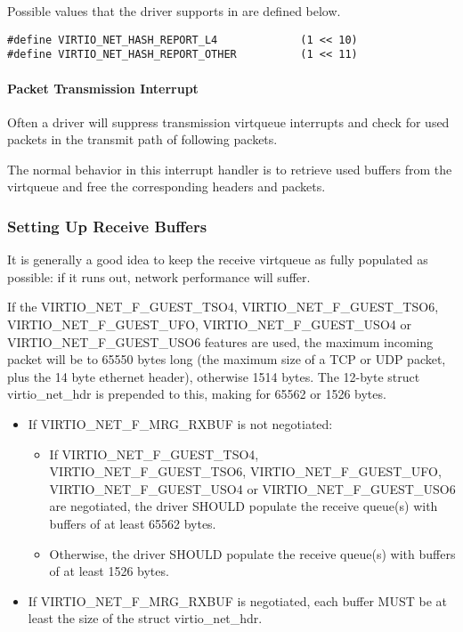 Possible values that the driver supports in  are defined below.

\begin{lstlisting}
#define VIRTIO_NET_HASH_REPORT_L4             (1 << 10)
#define VIRTIO_NET_HASH_REPORT_OTHER          (1 << 11)
\end{lstlisting}

\paragraph{Packet Transmission Interrupt}\label{sec:Device Types / Network Device / Device Operation / Packet Transmission / Packet Transmission Interrupt}

Often a driver will suppress transmission virtqueue interrupts
and check for used packets in the transmit path of following
packets.

The normal behavior in this interrupt handler is to retrieve
used buffers from the virtqueue and free the corresponding
headers and packets.

\subsubsection{Setting Up Receive Buffers}\label{sec:Device Types / Network Device / Device Operation / Setting Up Receive Buffers}

It is generally a good idea to keep the receive virtqueue as
fully populated as possible: if it runs out, network performance
will suffer.

If the VIRTIO_NET_F_GUEST_TSO4, VIRTIO_NET_F_GUEST_TSO6,
VIRTIO_NET_F_GUEST_UFO, VIRTIO_NET_F_GUEST_USO4 or VIRTIO_NET_F_GUEST_USO6
features are used, the maximum incoming packet
will be to 65550 bytes long (the maximum size of a
TCP or UDP packet, plus the 14 byte ethernet header), otherwise
1514 bytes.  The 12-byte struct virtio_net_hdr is prepended to this,
making for 65562 or 1526 bytes.


\begin{itemize}
\item If VIRTIO_NET_F_MRG_RXBUF is not negotiated:
  \begin{itemize}
    \item If VIRTIO_NET_F_GUEST_TSO4, VIRTIO_NET_F_GUEST_TSO6, VIRTIO_NET_F_GUEST_UFO,
	VIRTIO_NET_F_GUEST_USO4 or VIRTIO_NET_F_GUEST_USO6 are negotiated, the driver SHOULD populate
      the receive queue(s) with buffers of at least 65562 bytes.
    \item Otherwise, the driver SHOULD populate the receive queue(s)
      with buffers of at least 1526 bytes.
  \end{itemize}
\item If VIRTIO_NET_F_MRG_RXBUF is negotiated, each buffer MUST be at
least the size of the struct virtio_net_hdr.
\end{itemize}

